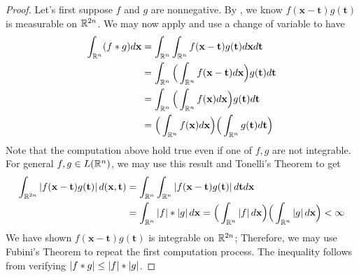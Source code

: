 \documentclass{report}
\begin{document}
\begin{proof}
  Let's first suppose $f$ and  $g$ are nonnegative. By , we know $f(\textbf{x}-\textbf{t})g(\textbf{t})$ is measurable on $\mathbb{R}^{2n}$. We may now apply  and use a change of variable to have 
\begin{align*}
\int_{\mathbb{R}^n}(f*g)d\textbf{x}&= \int_{\mathbb{R}^n}\int_{\mathbb{R}^n}f(\textbf{x}-\textbf{t})g(\textbf{t})d\textbf{x}d \textbf{t} \\
&=\int_{\mathbb{R}^n}\Big(\int_{\mathbb{R}^n}f(\textbf{x}-\textbf{t})d\textbf{x} \Big) g(\textbf{t}) d\textbf{t} \\
&=\int_{\mathbb{R}^n}\Big(\int_{\mathbb{R}^n}f(\textbf{x})d\textbf{x} \Big) g(\textbf{t})d\textbf{t} \\
&=\Big( \int_{\mathbb{R}^n} f(\textbf{x})d\textbf{x} \Big) \Big(\int_{\mathbb{R}^n}g(\textbf{t})d\textbf{t} \Big)
\end{align*}
Note that the computation above hold true even if one of $f,g$ are not integrable. For general $f,g \in L(\mathbb{R}^n)$, we may use this result and Tonelli's Theorem to get 
\begin{align*}
 \int_{\mathbb{R}^{2n}}\left|f(\textbf{x}-\textbf{t})g(\textbf{t})\right|d(\textbf{x},\textbf{t}) &=\int_{\mathbb{R}^n} \int_{\mathbb{R}^n}\left|f(\textbf{x}-\textbf{t})g(\textbf{t})\right|d\textbf{t} d\textbf{x} \\
  &=\int_{\mathbb{R}^n}\left|f\right|*\left|g\right|d\textbf{x} = \Big( \int_{\mathbb{R}^n}\left|f\right|d\textbf{x} \Big)\Big(\int_{\mathbb{R}^n}\left|g\right|d\textbf{x} \Big)<\infty
\end{align*}
We have shown $f(\textbf{x}-\textbf{t})g(\textbf{t})$ is integrable on $\mathbb{R}^{2n}$; Therefore, we may use Fubini's Theorem to repeat the first computation process. The inequality follows from verifying $\left|f * g\right|\leq \left|f\right| * \left|g\right|$. 
\end{proof}
\end{document}
